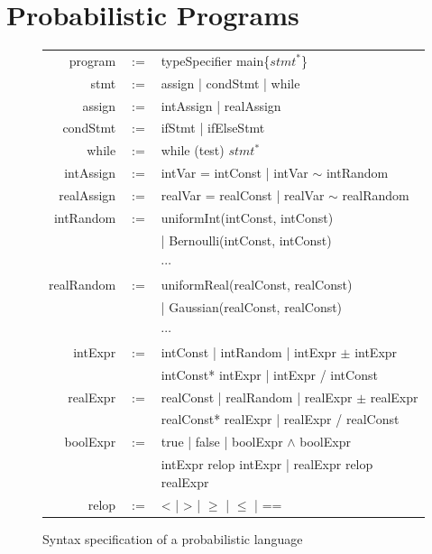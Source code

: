 \documentclass[sigconf,review, anonymous]{acmart}
\begin{document}
\section{Probabilistic Programs}
\begin{figure}[ht]
	\centering
	\begin{tabular}{rcl}
		\hline
		program & $:=$ & typeSpecifier main\{$stmt^*$\} \\
		stmt & $:=$ & assign | condStmt | while \\
		assign & $:=$ & intAssign | realAssign \\
		condStmt & $:=$ & ifStmt | ifElseStmt\\
		while & $:=$ & while (test) $stmt^*$\\
		intAssign & $:=$ &  intVar = intConst | intVar $\sim$ intRandom\\
		realAssign & $:=$ & realVar = realConst | realVar $\sim$ realRandom\\
		intRandom & $:=$ & uniformInt(intConst, intConst)\\
		&  & | Bernoulli(intConst, intConst)\\
		&  & $\cdots$ \\
		realRandom & $:=$ & uniformReal(realConst, realConst)\\
		&  & | Gaussian(realConst, realConst)\\
		&  & $\cdots$ \\
		intExpr & $:=$ & intConst | intRandom | intExpr $\pm$ intExpr\\
		& & intConst* intExpr | intExpr / intConst\\
		realExpr & $:=$ & realConst | realRandom | realExpr $\pm$ realExpr\\
		& & realConst* realExpr | realExpr / realConst\\
		boolExpr& $:=$ & true | false | boolExpr $\wedge$ boolExpr \\
		& & intExpr relop intExpr | realExpr relop realExpr\\
		relop & $:=$ & <  |  > | $\geq$ | $\leq$ | ==\\
		\hline
	\end{tabular}
	\caption{Syntax specification of a probabilistic language}	\label{syntax}
\end{figure}
\end{document}
